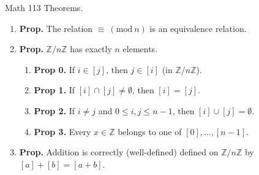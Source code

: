 \documentclass[12pt]{article}
\theoremstyle{definition}
\theoremstyle{named}
\newcommand{\Mod}[1]{\ (\mathrm{mod}\ #1)}
\begin{document}
\begin{center}
    Math 113 Theorems. 
\end{center}

\begin{enumerate}
    \item \textbf{Prop. } The relation $\equiv \Mod{n}$ is an equivalence relation. 
    \item \textbf{Prop. } $\mathbb{Z}/n\mathbb{Z}$ has exactly $n$ elements. 
    \begin{enumerate}
        \item \textbf{Prop 0. } If $i \in [j]$, then $j \in [i]$ (in $\mathbb{Z}/n\mathbb{Z}$). 
        \item \textbf{Prop 1. } If $[i] \cap [j] \neq \emptyset$, then $[i]=[j]$. 
        \item \textbf{Prop 2. } If $i \neq j$ and $0 \leq i,j \leq n-1$, then $[i]\cup[j] = \emptyset$. 
        \item \textbf{Prop 3. } Every $x \in \mathbb{Z}$ belongs to one of $[0],\dots,[n-1]$. 
    \end{enumerate}
	\item \textbf{Prop. } Addition is correctly (well-defined) defined on $\mathbb{Z}/n\mathbb{Z}$ by $[a] + [b] = [a+b]$. 
\end{enumerate}
\end{document}
